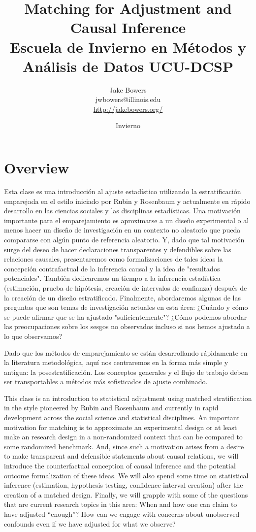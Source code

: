 \documentclass[10pt,letterpaper]{article}
\title{Matching for Adjustment and Causal Inference \\
  Escuela de Invierno en M\'{e}todos y An\'{a}lisis de Datos UCU-DCSP }
\author{Jake Bowers \\
  \small{jwbowers@illinois.edu \\
    \url{http://jakebowers.org/}}
}
\date{Invierno \the\year}
\makeatletter
\newenvironment{introstuff} {\setcounter{secnumdepth}{0}%
} {\setcounter{secnumdepth}{1}%
\restoregeometry
}
\def\maketitle{%
  \thispagestyle{empty}%
  \begin{center}\leavevmode
    \normalfont
    {\large \bfseries\@title\par}%
    {\large \@author\par}%
    {\large \@date\par}%
  \end{center}%
  \null }
\makeatother
\begin{document}
\pagestyle{myfancy}

\begin{introstuff}

\maketitle

  \part{Overview}

Esta clase es una introducción al ajuste estadístico utilizando la estratificación emparejada en el estilo iniciado por Rubin y Rosenbaum y actualmente en rápido desarrollo en las ciencias sociales y las disciplinas estadísticas. Una motivación importante para el emparejamiento es aproximarse a un diseño experimental o al menos hacer un diseño de investigación en un contexto no aleatorio que pueda compararse con algún punto de referencia aleatorio. Y, dado que tal motivación surge del deseo de hacer declaraciones transparentes y defendibles sobre las relaciones causales, presentaremos como formalizaciones de tales ideas la concepción contrafactual de la inferencia causal y la idea de "resultados potenciales". También dedicaremos un tiempo a la inferencia estadística (estimación, prueba de hipótesis, creación de intervalos de confianza) después de la creación de un diseño estratificado. Finalmente, abordaremos algunas de las preguntas que son temas de investigación actuales en esta área: ¿Cuándo y cómo se puede afirmar que se ha ajustado "suficientemente"? ¿Cómo podemos abordar las preocupaciones sobre los sesgos no observados incluso si nos hemos ajustado a lo que observamos?

Dado que los métodos de emparejamiento se están desarrollando rápidamente en la literatura metodológica, aquí nos centraremos en la forma más simple y antigua: la posestratificación. Los conceptos generales y el flujo de trabajo deben ser transportables a métodos más sofisticados de ajuste combinado.


  This class is an introduction to statistical adjustment using matched stratification in the style pioneered by Rubin and Rosenbaum and currently in rapid development across the social science and statistical disciplines. An important motivation for matching is to approximate an experimental design or at least make an research design in a non-randomized context that can be compared to some randomized benchmark. And, since such a motivation arises from a desire to make transparent and defensible statements about causal relations, we will introduce the counterfactual conception of causal inference and the potential outcome formalization of these ideas. We will also spend some time on statistical inference (estimation, hypothesis testing, confidence interval creation) after the creation of a matched design. Finally, we will grapple with some of the questions that are current research topics in this area: When and how one can claim to have adjusted ``enough''? How can we engage with concerns about unobserved confounds even if we have adjusted for what we observe?


\end{introstuff}
\end{document}
